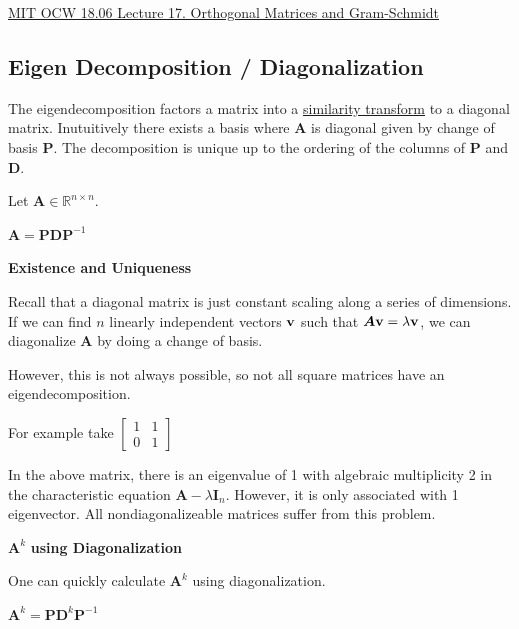 \documentclass[11pt]{article}
\begin{document}
  \href{https://www.youtube.com/watch?v=0MtwqhIwdrI}{MIT OCW 18.06 Lecture 17. Orthogonal Matrices and Gram-Schmidt}

  \pagebreak

  \subsection{Eigen Decomposition / Diagonalization}

  The eigendecomposition factors a matrix into a
  \href{https://mathworld.wolfram.com/SimilarityTransformation.html}{similarity transform} to a diagonal matrix. Inutuitively
  there exists a basis where \(\bm{A}\) is diagonal given by change of basis \(\bm{P}\). The decomposition
  is unique up to the ordering of the columns of \(\bm{P}\) and \(\bm{D}\).

  Let \(\bm{A} \in \mathbb{R}^{n \times n}\).

  \(\bm{A} = \bm{P}\bm{D}\bm{P}^{-1}\)

  \vspace{12pt}

  \textbf{Existence and Uniqueness}

  Recall that a diagonal matrix is just constant scaling along a series of dimensions. If we can
  find \(n\) linearly independent vectors \(\mathbf{v}\) such that \(\bm{A}\mathbf{v} = \lambda \mathbf{v}\),
  we can diagonalize \(\bm{A}\) by doing a change of basis.

  However, this is not always possible, so not all square matrices have an eigendecomposition.

  For example take
  \(\begin{bmatrix}
    1 & 1 \\
    0 & 1
  \end{bmatrix}\)

  In the above matrix, there is an eigenvalue of 1 with algebraic multiplicity 2 in the characteristic
  equation \(\bm{A} - \lambda\bm{I}_n\). However, it is only associated with 1 eigenvector. All
  nondiagonalizeable matrices suffer from this problem.

  \vspace{12pt}

  \(\bm{A}^k\) \textbf{using Diagonalization}

  One can quickly calculate \(\bm{A}^k\) using diagonalization.

  \(\bm{A}^k = \bm{P}\bm{D}^k\bm{P}^{-1}\)

  \vspace{12pt}
\end{document}
